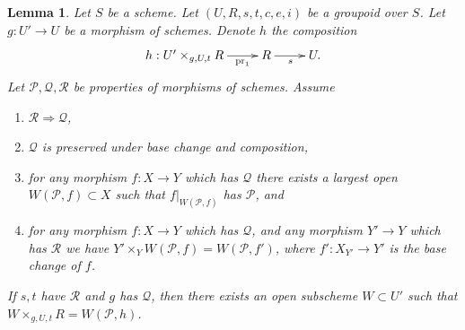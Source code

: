 \documentclass{stacks-project}
\theoremstyle{plain}
\newtheorem{lemma}[subsection]{Lemma}
\theoremstyle{definition}
\theoremstyle{remark}
\numberwithin{equation}{subsection}
\begin{document}
\begin{lemma}
\label{lemma-local-source}
Let $S$ be a scheme.
Let $(U, R, s, t, c, e, i)$ be a groupoid over $S$.
Let $g : U' \to U$ be a morphism of schemes.
Denote $h$ the composition
$$
\xymatrix{
h : U' \times_{g, U, t} R \ar[r]_-{\text{pr}_1} & R \ar[r]_s & U.
}
$$
Let $\mathcal{P}, \mathcal{Q}, \mathcal{R}$ be properties of morphisms
of schemes. Assume
\begin{enumerate}
\item $\mathcal{R} \Rightarrow \mathcal{Q}$,
\item $\mathcal{Q}$ is preserved under base change and composition,
\item for any morphism $f : X \to Y$ which has $\mathcal{Q}$ there exists a
largest open $W(\mathcal{P}, f) \subset X$ such that $f|_{W(\mathcal{P}, f)}$
has $\mathcal{P}$, and
\item for any morphism $f : X \to Y$ which has $\mathcal{Q}$,
and any morphism $Y' \to Y$ which has $\mathcal{R}$ we have
$Y' \times_Y W(\mathcal{P}, f) = W(\mathcal{P}, f')$, where
$f' : X_{Y'} \to Y'$ is the base change of $f$.
\end{enumerate}
If $s, t$ have $\mathcal{R}$ and $g$ has $\mathcal{Q}$, then
there exists an open subscheme $W \subset U'$ such that
$W \times_{g, U, t} R = W(\mathcal{P}, h)$.
\end{lemma}
\end{document}
